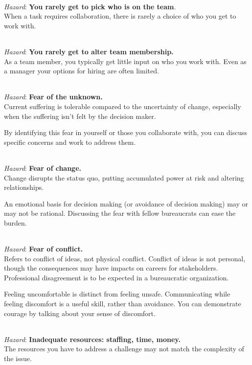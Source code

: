 \ \\

\textit{Hazard}: \textbf{You rarely get to pick who is on the team}. \\
When a task requires collaboration, there is rarely a choice of who you get to work with. 

\ \\

\textit{Hazard}: \textbf{You rarely get to alter team membership.}\\
As a team member, you typically get little input on who you work with. Even as a manager your options for hiring are often limited. 

\ \\

\textit{Hazard}: \textbf{Fear of the unknown.}\\
Current suffering is tolerable compared to the uncertainty of change, especially when the suffering isn't felt by the decision maker.

By identifying this fear in yourself or those you collaborate with, you can discuss specific concerns and work to address them.

\ \\

\textit{Hazard}: \textbf{Fear of change.} \\
Change disrupts the status quo, putting accumulated power at risk and altering relationships. 

An emotional basis for decision making (or avoidance of decision making) may or may not be rational. Discussing the fear with fellow bureaucrats can ease the burden. 

\ \\
\textit{Hazard}: \textbf{Fear of conflict.}\\
Refers to conflict of ideas, not physical conflict. Conflict of ideas is not personal, though the consequences may have impacts on careers for stakeholders. \\
Professional disagreement is to be expected in a bureaucratic organization.

Feeling uncomfortable is distinct from feeling unsafe. Communicating while feeling discomfort is a useful skill, rather than avoidance. You can demonstrate courage by talking about your sense of discomfort. 

\ \\
\textit{Hazard}: \textbf{Inadequate resources: staffing, time, money.}\\
The resources you have to address a challenge may not match the complexity of the issue.

